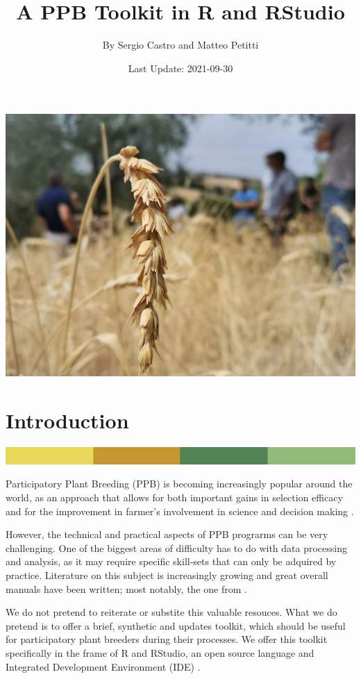 \documentclass[
]{book}
\title{A PPB Toolkit in R and RStudio}
\author{By Sergio Castro and Matteo Petitti}
\date{Last Update: 2021-09-30}
\begin{document}
\maketitle

{
\setcounter{tocdepth}{1}
\tableofcontents
}
\includegraphics{Cover.jpg}

\hypertarget{introduction}{%
\chapter{Introduction}\label{introduction}}

\includegraphics{rsrstrip.png}

Participatory Plant Breeding (PPB) is becoming increasingly popular around the world, as an approach that allows for both important gains in selection efficacy and for the improvement in farmer's involvement in science and decision making \citep{Ceccareli2020}.

However, the technical and practical aspects of PPB prograrms can be very challenging. One of the biggest areas of difficulty has to do with data processing and analysis, as it may require specific skill-sets that can only be adquired by practice. Literature on this subject is increasingly growing and great overall manuals have been written; most notably, the one from \citet{Tech-Manual}.

We do not pretend to reiterate or substite this valuable resouces. What we do pretend is to offer a brief, synthetic and updates toolkit, which should be useful for participatory plant breeders during their processes. We offer this toolkit specifically in the frame of R and RStudio, an open source language and Integrated Development Environment (IDE) \citet{Rstudio}.
\end{document}
